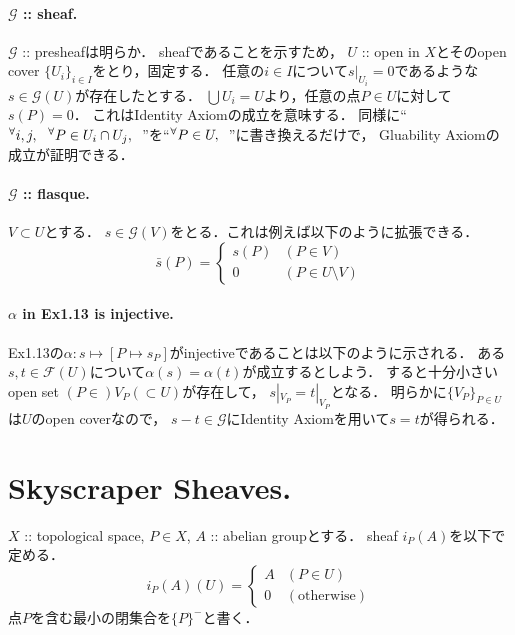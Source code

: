 \documentclass[a4paper]{jsarticle}
\newcommand{\shF}{\mathcal{F}}
\newcommand{\shG}{\mathcal{G}}
\begin{document}
    \paragraph{$\shG$ :: sheaf.}
    $\shG$ :: presheafは明らか．
    sheafであることを示すため，
    $U$ :: open in $X$とそのopen cover $\{U_i\}_{i \in I}$をとり，固定する．
    任意の$i \in I$について$s|_{U_i}=0$であるような$s \in \shG(U)$が存在したとする．
    $\bigcup U_i=U$より，任意の点$P \in U$に対して$s(P)=0$．
    これはIdentity Axiomの成立を意味する．
    同様に``${}^{\forall} i,j,~~ {}^{\forall} P \in U_i \cap U_j,~~$''を``${}^{\forall} P \in U,~~$''に書き換えるだけで，
    Gluability Axiomの成立が証明できる．

    \paragraph{$\shG$ :: flasque.}
    $V \subset U$とする．
    $s \in \shG(V)$をとる．これは例えば以下のように拡張できる．
    \[
        \bar{s}(P)=
        \begin{cases}{}
            s(P) & (P \in V) \\
            0 & (P \in U \setminus V)
        \end{cases}
    \]

    \paragraph{$\alpha$ in Ex1.13 is injective.}
    Ex1.13の$\alpha: s \mapsto [P \mapsto s_P]$がinjectiveであることは以下のように示される．
    ある$s,t \in \shF(U)$について$\alpha(s)=\alpha(t)$が成立するとしよう．
    すると十分小さいopen set $(P \in) V_P (\subset U)$が存在して，
    $s|_{V_P}=t|_{V_P}$となる．
    明らかに$\{V_P\}_{P \in U}$は$U$のopen coverなので，
    $s-t \in \shG$にIdentity Axiomを用いて$s=t$が得られる．

\section{Skyscraper Sheaves.} %
    $X$ :: topological space, $P \in X$, $A$ :: abelian groupとする．
    sheaf $i_P(A)$を以下で定める．
    \[
        i_P(A)(U)=
        \begin{cases}{}
            A & (P \in U) \\
            0 & (\text{otherwise})
        \end{cases}
    \]
    点$P$を含む最小の閉集合を$\{P\}^-$と書く．
\end{document}
